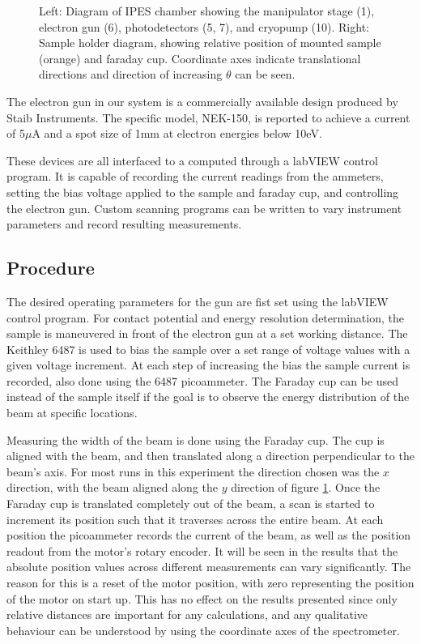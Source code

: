 \begin{figure}[h!]
    \caption{Left: Diagram of IPES chamber showing the manipulator stage (1), electron gun (6), photodetectors (5, 7), and cryopump (10). 
    Right: Sample holder diagram, showing relative position of mounted sample (orange) and faraday cup. Coordinate axes indicate translational directions
    and direction of increasing $\theta$ can be seen\cite{mcmahon_2012}.}
    \label{fig:holder}
\end{figure}

\clearpage
The electron gun in our system is a commercially available design produced by Staib Instruments. The specific model, NEK-150, is reported to achieve a current of 5$\mu$A and a spot size of 1mm at electron 
energies below 10eV\cite{staib}. 

These devices are all interfaced to a computed through a labVIEW control program. It is capable of recording the current readings from the ammeters, setting the bias voltage applied 
to the sample and faraday cup, and controlling the electron gun. Custom scanning programs can be written to vary instrument parameters and record resulting measurements. 

\subsection{Procedure}

The desired operating parameters for the gun are fist set using the labVIEW control program. For contact potential and energy resolution determination, the sample is maneuvered in front 
of the electron gun at a set working distance. The Keithley 6487 is used to bias the sample over a set range of voltage values with a given voltage increment. At each step of increasing 
the bias the sample current is recorded, also done using the 6487 picoammeter. The Faraday cup can be used instead of the sample itself if the goal is to observe the energy distribution 
of the beam at specific locations. 

Measuring the width of the beam is done using the Faraday cup. The cup is aligned with the beam, and then translated along a direction perpendicular to the beam's axis. For most 
runs in this experiment the direction chosen was the $x$ direction, with the beam aligned along the $y$ direction of figure \ref{fig:holder}. Once the Faraday cup is translated completely 
out of the beam, a scan is started to increment its position such that it traverses across the entire beam. At each position the picoammeter records the current of the beam, as well 
as the position readout from the motor's rotary encoder. It will be seen in the results that the absolute position values across different measurements 
can vary significantly. The reason for this is a reset of the motor position, with zero representing the position of the motor on start up. This has no effect on the results presented since only 
relative distances are important for any calculations, and any qualitative behaviour can be understood by using the coordinate axes of the spectrometer.


